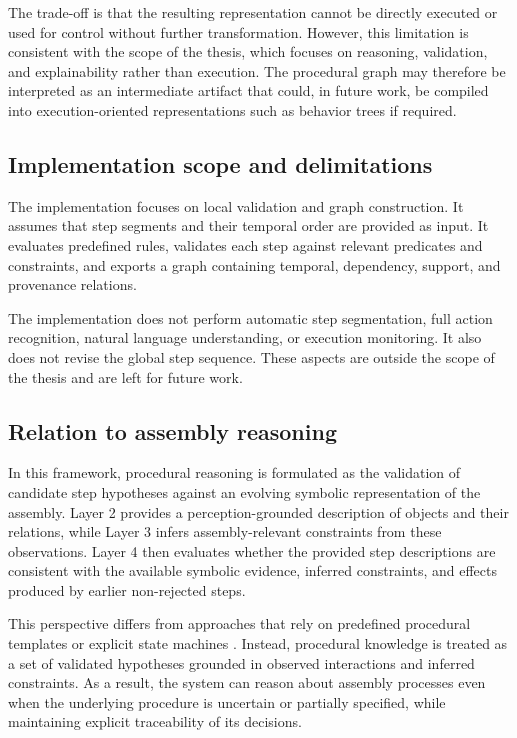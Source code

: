 The trade-off is that the resulting representation cannot be directly executed or used for control without further transformation. However, this limitation is consistent with the scope of the thesis, which focuses on reasoning, validation, and explainability rather than execution. The procedural graph may therefore be interpreted as an intermediate artifact that could, in future work, be compiled into execution-oriented representations such as behavior trees if required.

\subsection{Implementation scope and delimitations}

The implementation focuses on local validation and graph construction. It assumes that step segments and their temporal order are provided as input. It evaluates predefined rules, validates each step against relevant predicates and constraints, and exports a graph containing temporal, dependency, support, and provenance relations.

The implementation does not perform automatic step segmentation, full action recognition, natural language understanding, or execution monitoring. It also does not revise the global step sequence. These aspects are outside the scope of the thesis and are left for future work.

\subsection{Relation to assembly reasoning}

In this framework, procedural reasoning is formulated as the validation of candidate step hypotheses against an evolving symbolic representation of the assembly. Layer 2 provides a perception-grounded description of objects and their relations, while Layer 3 infers assembly-relevant constraints from these observations. Layer 4 then evaluates whether the provided step descriptions are consistent with the available symbolic evidence, inferred constraints, and effects produced by earlier non-rejected steps.

This perspective differs from approaches that rely on predefined procedural templates or explicit state machines \citep{Stanescu_2022,Stanescu_2023,Stanescu_2024}. Instead, procedural knowledge is treated as a set of validated hypotheses grounded in observed interactions and inferred constraints. As a result, the system can reason about assembly processes even when the underlying procedure is uncertain or partially specified, while maintaining explicit traceability of its decisions.


